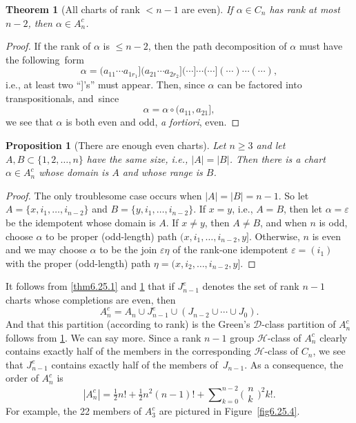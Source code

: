\documentclass{surv-l}
\numberwithin{equation}{section}
\numberwithin{table}{section}
\numberwithin{figure}{section}
\newtheorem{theorem}[equation]{Theorem}
\newtheorem{proposition}[equation]{Proposition}
\theoremstyle{definition}
\begin{document}
\begin{theorem}[All charts of rank $<n -1$ are even]\label{thm6.25.2} If
$\alpha\in C_{n}$ has rank at most $n -2$, then $\alpha\in
A_{n}^{c}$.
\end{theorem}

\begin{proof} If the rank of $\alpha$ is $\leq n -2$, then the path
decomposition of $\alpha$ must have the following~form
\[
\alpha=(a_{11}\cdots a_{1r_{1}}](a_{21}\cdots a_{2r_{2}}](\cdots]\cdots(\cdots](\cdots)\cdots(\cdots),
\]
i.e., at least two ``]'s'' must appear. Then, since $\alpha$ can
be factored into transpositionals, and~since
\[
\alpha=\alpha\circ(a_{11}, a_{21}],
\]
we see that $\alpha$ is both even and odd, \emph{a fortiori},
even.
\end{proof}

\begin{proposition}[There are enough even charts]\label{prop6.25.3}
Let $n \geq 3$ and let $A, B\subset\{1,2,\ldots, n\}$ have the
same size, i.e., $|A|=|B|$. Then there is a chart $\alpha\in
A_{n}^{c}$ whose domain is $A$ and whose range is $B$.
\end{proposition}

\begin{proof} The only troublesome case occurs when $|A|=|B|=n -1$. So
let $A=\{x, i_{1},\ldots, i_{n-2}\}$ and $B=\{y, i_{1},\ldots,
i_{n-2}\}$. If $x=y$, i.e., $A=B$, then let $\alpha=\varepsilon$
be the idempotent whose domain is $A$. If $x\neq y$, then $A\neq B$,
and when $n$ is odd, choose $\alpha$ to be proper (odd-length)
path $(x, i_{1},\ldots, i_{n-2}, y]$. Otherwise, $n$ is even and
we may choose $\alpha$ to be the join $\varepsilon\eta$ of the
rank-one idempotent $\varepsilon =(i_{1})$ with the proper
(odd-length) path $\eta=(x, i_{2},\ldots, i_{n-2}, y].$
\end{proof}

It follows from \ref{thm6.25.1} and \ref{thm6.25.2} that if
$J_{n-1}^{e}$ denotes the set of rank $n-1$ charts whose
completions are even, then
\[
A_{n}^{c}=A_{n}\cup J_{n-1}^{e}\cup(J_{n-2}\cup\cdots\cup J_{0}).
\]
And that this partition (according to rank) is the Green's
$\mathcal{D}$-class partition of $A_{n}^{c}$ follows from
\ref{prop6.25.3}. We can say more. Since a rank $n-1$ group
$\mathcal{H}$-class of $A_{n}^{c}$ clearly contains exactly half
of the members in the corresponding $\mathcal{H}$-class of
$C_{n}$, we see that $J_{n-1}^{e}$ contains exactly half of the
members of~$J_{n-1}$. As a consequence, the order of $A_{n}^{c}$
is
\[
|A_{n}^{c}|=\tfrac{1}{2}n!+\tfrac{1}{2}n^{2} (n-1)!+\sum\nolimits_{k=0}^{n-2}\big(\!\begin{smallmatrix}
n\\
k\end{smallmatrix}\!\big)^2 {k}!.
\]
For example, the 22 members of $A_{3}^{c}$ are pictured in
Figure~\ref{fig6.25.4}.
\end{document}
